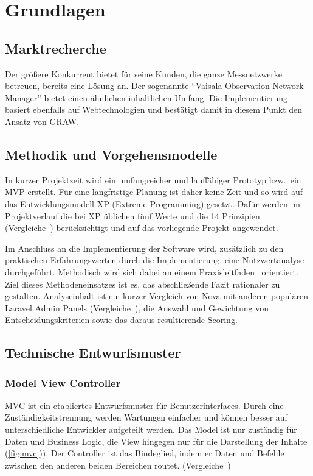 \section{Grundlagen}

\subsection{Marktrecherche}
Der größere Konkurrent bietet für seine Kunden, die ganze Messnetzwerke betreuen, bereits eine Lösung an.
Der sogenannte \enquote{Vaisala Observation Network Manager}\cite{observation-network-manager} bietet einen ähnlichen inhaltlichen Umfang.
Die Implementierung basiert ebenfalls auf Webtechnologien und bestätigt damit in diesem Punkt den Ansatz von GRAW.

\subsection{Methodik und Vorgehensmodelle}
In kurzer Projektzeit wird ein umfangreicher und lauffähiger Prototyp bzw.\ ein MVP erstellt.
Für eine langfristige Planung ist daher keine Zeit und so wird auf das Entwicklungsmodell XP (Extreme Programming) gesetzt.
Dafür werden im Projektverlauf die bei XP üblichen fünf Werte und die 14 Prinzipien (Vergleiche~\cite{agile-prozesse}) berücksichtigt und auf das vorliegende Projekt angewendet.

Im Anschluss an die Implementierung der Software wird, zusätzlich zu den praktischen Erfahrungswerten durch die Implementierung, eine Nutzwertanalyse durchgeführt.
Methodisch wird sich dabei an einem Praxisleitfaden~\cite{scoring-und-nutzwertanalysen} orientiert.
Ziel dieses Methodeneinsatzes ist es, das abschließende Fazit rationaler zu gestalten.
Analyseinhalt ist ein kurzer Vergleich von Nova mit anderen populären Laravel Admin Panels (Vergleiche~\cite{the-guide-to-laravel-admin-panels}), die Auswahl und Gewichtung von Entscheidungskriterien sowie das daraus resultierende Scoring.

\subsection{Technische Entwurfsmuster}

\subsubsection{Model View Controller}
MVC ist ein etabliertes Entwurfsmuster für Benutzerinterfaces.
Durch eine Zuständigkeitstrennung werden Wartungen einfacher und können besser auf unterschiedliche Entwickler aufgeteilt werden.
Das Model ist nur zuständig für Daten und Business Logic, die View hingegen nur für die Darstellung der Inhalte (\ref{fig:mvc})).
Der Controller ist das Bindeglied, indem er Daten und Befehle zwischen den anderen beiden Bereichen routet.
(Vergleiche~\cite{mdn-glossary-mvc})

